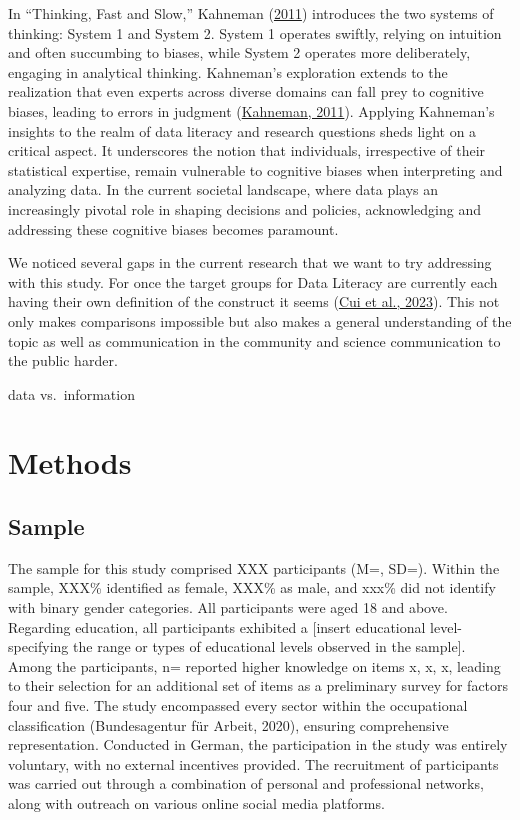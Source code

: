 \documentclass[
  12pt,
  a4paper,
  twoside]{article}
\begin{document}
In ``Thinking, Fast and Slow,'' Kahneman (\protect\hyperlink{ref-kahneman2011}{2011}) introduces the two systems of thinking: System 1 and System 2. System 1 operates swiftly, relying on intuition and often succumbing to biases, while System 2 operates more deliberately, engaging in analytical thinking. Kahneman's exploration extends to the realization that even experts across diverse domains can fall prey to cognitive biases, leading to errors in judgment (\protect\hyperlink{ref-kahneman2011}{Kahneman, 2011}).
Applying Kahneman's insights to the realm of data literacy and research questions sheds light on a critical aspect. It underscores the notion that individuals, irrespective of their statistical expertise, remain vulnerable to cognitive biases when interpreting and analyzing data. In the current societal landscape, where data plays an increasingly pivotal role in shaping decisions and policies, acknowledging and addressing these cognitive biases becomes paramount.

We noticed several gaps in the current research that we want to try addressing with this study. For once the target groups for Data Literacy are currently each having their own definition of the construct it seems (\protect\hyperlink{ref-Cui2023}{Cui et al., 2023}). This not only makes comparisons impossible but also makes a general understanding of the topic as well as communication in the community and science communication to the public harder.

data vs.~information

\hypertarget{methods}{%
\section{Methods}\label{methods}}

\hypertarget{sample}{%
\subsection{Sample}\label{sample}}

The sample for this study comprised XXX participants (M=, SD=). Within the sample, XXX\% identified as female, XXX\% as male, and xxx\% did not identify with binary gender categories. All participants were aged 18 and above. Regarding education, all participants exhibited a {[}insert educational level- specifying the range or types of educational levels observed in the sample{]}. Among the participants, n= reported higher knowledge on items x, x, x, leading to their selection for an additional set of items as a preliminary survey for factors four and five.
The study encompassed every sector within the occupational classification (Bundesagentur für Arbeit, 2020), ensuring comprehensive representation. Conducted in German, the participation in the study was entirely voluntary, with no external incentives provided. The recruitment of participants was carried out through a combination of personal and professional networks, along with outreach on various online social media platforms.
\end{document}
